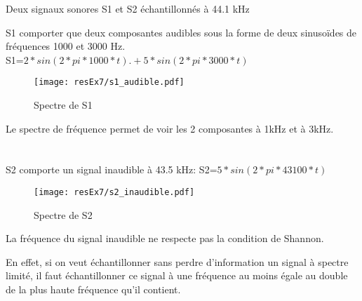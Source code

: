 
Deux signaux sonores S1 et S2 échantillonnés à 44.1 kHz


S1 comporter que deux composantes audibles sous la forme de deux sinusoïdes de fréquences 1000 et 3000 Hz.
\\
S1=$2*sin(2*pi*1000*t) .+ 5*sin(2*pi*3000*t)$


\begin{figure}[H]
\centering
\texttt{[image: resEx7/s1\_audible.pdf]}
\caption{Spectre de S1}
\end{figure}

Le spectre de fréquence permet de voir les 2 composantes à 1kHz et à 3kHz.
\\\\\\


S2 comporte un signal inaudible à 43.5 kHz: S2=$5*sin(2*pi*43100*t)$

\begin{figure}[H]
\centering
\texttt{[image: resEx7/s2\_inaudible.pdf]}
\caption{Spectre de S2}
\end{figure}

La fréquence du signal inaudible ne respecte pas la condition de Shannon.

En effet, si on veut échantillonner sans perdre d'information un signal à spectre limité, il faut échantillonner ce signal à une fréquence au moins égale au double de la plus haute fréquence qu'il contient.


